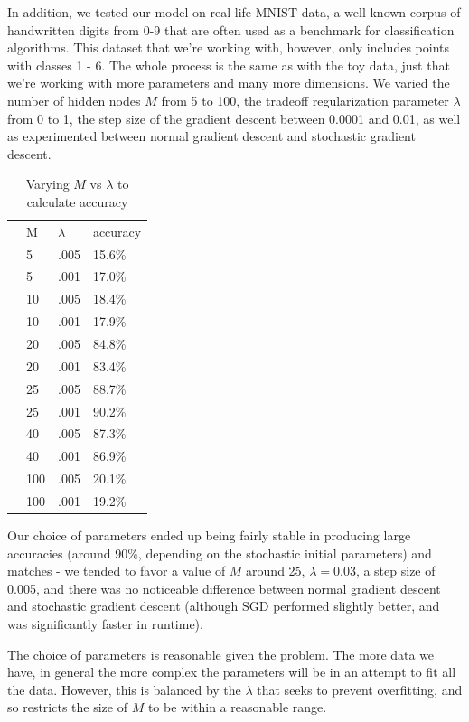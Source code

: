 \documentclass[11pt,letterpaper]{article}
\begin{document}
In addition, we tested our model on real-life MNIST data, a well-known corpus of handwritten digits from 0-9 that are often used as a benchmark for classification algorithms. This dataset that we're working with, however, only includes points with classes 1 - 6. The whole process is the same as with the toy data, just that we're working with more parameters and many more dimensions. We varied the number of hidden nodes $M$ from 5 to 100, the tradeoff regularization parameter $\lambda$ from 0 to 1, the step size of the gradient descent between 0.0001 and 0.01, as well as experimented between normal gradient descent and stochastic gradient descent.
\begin{table}[!htb]
\centering
\caption{Varying $M$ vs $\lambda$ to calculate accuracy}
\label{my-label}
\begin{tabular}{llll}
 & M   & $\lambda$ & accuracy \\
 & 5   & .005    & 15.6\%   \\
 & 5   & .001    & 17.0\%   \\
 & 10  & .005    & 18.4\%   \\
 & 10  & .001    & 17.9\%   \\
 & 20  & .005    & 84.8\%   \\
 & 20  & .001    & 83.4\%   \\
 & 25  & .005    & 88.7\%   \\
 & 25  & .001    & 90.2\%   \\
 & 40  & .005    & 87.3\%   \\
 & 40  & .001    & 86.9\%   \\
 & 100 & .005    & 20.1\%   \\
 & 100 & .001    & 19.2\%  
\end{tabular}
\end{table}
Our choice of parameters ended up being fairly stable in producing large accuracies (around $90\%$, depending on the stochastic initial parameters) and matches - we tended to favor a value of $M$ around 25, $\lambda=0.03$, a step size of 0.005, and there was no noticeable difference between normal gradient descent and stochastic gradient descent (although SGD performed slightly better, and was significantly faster in runtime).

The choice of parameters is reasonable given the problem. The more data we have, in general the more complex the parameters will be in an attempt to fit all the data. However, this is balanced by the $\lambda$ that seeks to prevent overfitting, and so restricts the size of $M$ to be within a reasonable range.
\end{document}
